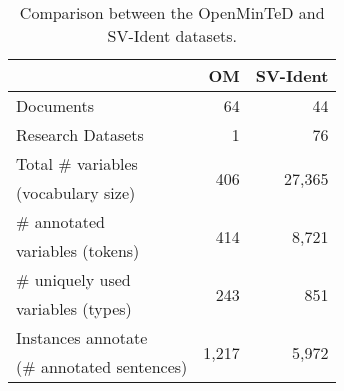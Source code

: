 \documentclass[11pt]{article}
\begin{document}
\begin{table}[]
    \centering
    \begin{tabular}{l|r|r}
         & OM & SV-Ident \\
        \hline
        \hline
        Documents & 64  &  44 \\
        \hline
        Research Datasets & 1 & 76 \\
        \hline
        Total \# variables  & \multirow{2}{*}{406} & \multirow{2}{*}{27,365} \\
        (vocabulary size) & &\\
        \hline
        \# annotated & \multirow{2}{*}{414} & \multirow{2}{*}{8,721}\\
        variables (tokens) & &\\
        \hline
        \# uniquely used & \multirow{2}{*}{243} & \multirow{2}{*}{851}\\
        variables (types) & &\\
        \hline
        Instances annotate & \multirow{2}{*}{1,217} & \multirow{2}{*}{5,972}\\
        (\# annotated sentences) & &\\
    \hline
    \end{tabular}
    \caption{Comparison between the OpenMinTeD and SV-Ident datasets.}
    \label{tab:svident_vs_om}
\end{table}
\end{document}
